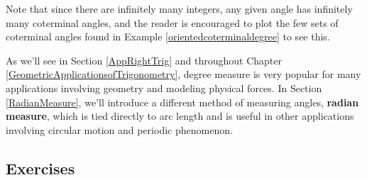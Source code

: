 Note that since there are infinitely many integers, any given angle has infinitely many coterminal angles, and the reader is encouraged to plot the few sets of coterminal angles found in Example \ref{orientedcoterminaldegree} to see this.  

\smallskip

As we'll see in Section \ref{AppRightTrig} and throughout Chapter \ref{GeometricApplicationsofTrigonometry}, degree measure is very popular for many applications involving geometry and modeling physical forces.  In Section \ref{RadianMeasure}, we'll introduce a different method of measuring angles, \textbf{radian measure}, which is tied directly to arc length and is useful in other applications involving circular motion and periodic phenomenon. 

\newpage

\subsection{Exercises}



\closegraphsfile